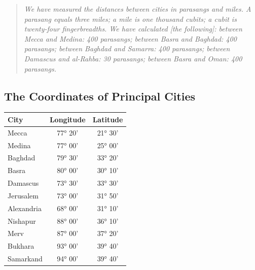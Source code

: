 \documentclass[11pt,a4paper]{article}
\begin{document}
\begin{quote}

\small

\textit{We have measured the distances between cities in parasangs and miles. A parasang equals three miles; a mile is one thousand cubits; a cubit is twenty-four fingerbreadths. We have calculated [the following]: between Mecca and Medina: 400 parasangs; between Basra and Baghdad: 400 parasangs; between Baghdad and Samarra: 400 parasangs; between Damascus and al-Rahba: 30 parasangs; between Basra and Oman: 400 parasangs.}

\end{quote}



\vspace{0.5cm}



\subsection{The Coordinates of Principal Cities}



\begin{center}

\begin{longtable}{lcc}

\toprule

\textbf{City} & \textbf{Longitude} & \textbf{Latitude} \\

\midrule

\endhead

Mecca & 77° 20' & 21° 30' \\

Medina & 77° 00' & 25° 00' \\

Baghdad & 79° 30' & 33° 20' \\

Basra & 80° 00' & 30° 10' \\

Damascus & 73° 30' & 33° 30' \\

Jerusalem & 73° 00' & 31° 50' \\

Alexandria & 68° 00' & 31° 10' \\

Nishapur & 88° 00' & 36° 10' \\

Merv & 87° 00' & 37° 20' \\

Bukhara & 93° 00' & 39° 40' \\

Samarkand & 94° 00' & 39° 40' \\

\bottomrule

\end{longtable}

\end{center}
\end{document}

